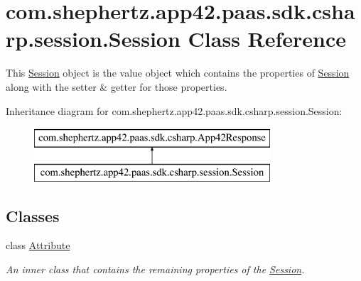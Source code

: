 \hypertarget{classcom_1_1shephertz_1_1app42_1_1paas_1_1sdk_1_1csharp_1_1session_1_1_session}{\section{com.\+shephertz.\+app42.\+paas.\+sdk.\+csharp.\+session.\+Session Class Reference}
\label{classcom_1_1shephertz_1_1app42_1_1paas_1_1sdk_1_1csharp_1_1session_1_1_session}
}


This \hyperlink{classcom_1_1shephertz_1_1app42_1_1paas_1_1sdk_1_1csharp_1_1session_1_1_session}{Session} object is the value object which contains the properties of \hyperlink{classcom_1_1shephertz_1_1app42_1_1paas_1_1sdk_1_1csharp_1_1session_1_1_session}{Session} along with the setter \& getter for those properties.  


Inheritance diagram for com.\+shephertz.\+app42.\+paas.\+sdk.\+csharp.\+session.\+Session\+:\begin{figure}[H]
\begin{center}
\leavevmode
\includegraphics[height=2.000000cm]{classcom_1_1shephertz_1_1app42_1_1paas_1_1sdk_1_1csharp_1_1session_1_1_session}
\end{center}
\end{figure}
\subsection*{Classes}
\begin{DoxyCompactItemize}
\item 
class \hyperlink{classcom_1_1shephertz_1_1app42_1_1paas_1_1sdk_1_1csharp_1_1session_1_1_session_1_1_attribute}{Attribute}
\begin{DoxyCompactList}\small\item\em An inner class that contains the remaining properties of the \hyperlink{classcom_1_1shephertz_1_1app42_1_1paas_1_1sdk_1_1csharp_1_1session_1_1_session}{Session}. \end{DoxyCompactList}\end{DoxyCompactItemize}
